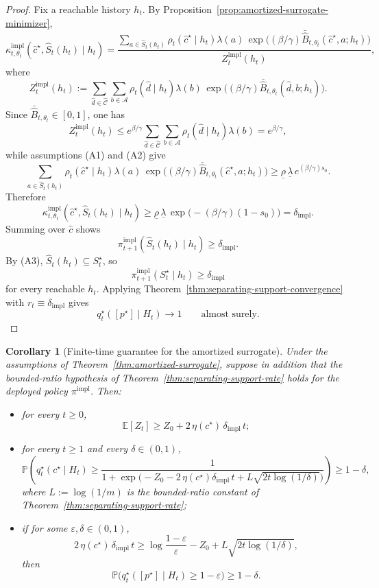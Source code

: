 \documentclass[11pt]{article}
\newtheorem{corollary}[theorem]{Corollary}
\theoremstyle{definition}
\theoremstyle{remark}
\newcommand{\Acal}{\mathcal{A}}
\newcommand{\Ccal}{\mathcal{C}}
\newcommand{\E}{\mathbb{E}}
\newcommand{\Prob}{\mathbb{P}}
\begin{document}
\begin{proof}
Fix a reachable history $h_t$. By Proposition~\ref{prop:amortized-surrogate-minimizer},
\[
\kappa_{t,\theta_t}^{\mathrm{impl}}(\hat c^\star,\widehat S_t(h_t)\mid h_t)
=
\frac{
\sum_{a\in\widehat S_t(h_t)}
\rho_t(\hat c^\star\mid h_t)\lambda(a)\,
\exp\!\bigl((\beta/\gamma)\bar{\widehat B}_{t,\theta_t}(\hat c^\star,a;h_t)\bigr)}
{Z_t^{\mathrm{impl}}(h_t)},
\]
where
\[
Z_t^{\mathrm{impl}}(h_t)
:=
\sum_{\hat d\in\widehat{\Ccal}}\sum_{b\in\Acal}
\rho_t(\hat d\mid h_t)\lambda(b)\,
\exp\!\bigl((\beta/\gamma)\bar{\widehat B}_{t,\theta_t}(\hat d,b;h_t)\bigr).
\]
Since $\bar{\widehat B}_{t,\theta_t}\in[0,1]$, one has
\[
Z_t^{\mathrm{impl}}(h_t)\le e^{\beta/\gamma}
\sum_{\hat d\in\widehat{\Ccal}}\sum_{b\in\Acal}
\rho_t(\hat d\mid h_t)\lambda(b)
=
e^{\beta/\gamma},
\]
while assumptions \textup{(A1)} and \textup{(A2)} give
\[
\sum_{a\in\widehat S_t(h_t)}
\rho_t(\hat c^\star\mid h_t)\lambda(a)\,
\exp\!\bigl((\beta/\gamma)\bar{\widehat B}_{t,\theta_t}(\hat c^\star,a;h_t)\bigr)
\ge
\underline\rho\,\underline\lambda\,e^{(\beta/\gamma)s_0}.
\]
Therefore
\[
\kappa_{t,\theta_t}^{\mathrm{impl}}(\hat c^\star,\widehat S_t(h_t)\mid h_t)
\ge
\underline\rho\,\underline\lambda\,
\exp\!\bigl(-(\beta/\gamma)(1-s_0)\bigr)
=
\delta_{\mathrm{impl}}.
\]
Summing over $\hat c$ shows
\[
\pi_{t+1}^{\mathrm{impl}}(\widehat S_t(h_t)\mid h_t)\ge \delta_{\mathrm{impl}}.
\]
By \textup{(A3)}, $\widehat S_t(h_t)\subseteq S_t^\star$, so
\[
\pi_{t+1}^{\mathrm{impl}}(S_t^\star\mid h_t)\ge \delta_{\mathrm{impl}}
\]
for every reachable $h_t$. Applying Theorem~\ref{thm:separating-support-convergence} with $r_t\equiv \delta_{\mathrm{impl}}$ gives
\[
q_t^\star([p^\star]\mid H_t)\to 1
\qquad\text{almost surely.}
\]
\end{proof}

\begin{corollary}[Finite-time guarantee for the amortized surrogate]
\label{cor:amortized-surrogate-finite-time}
Under the assumptions of Theorem~\ref{thm:amortized-surrogate}, suppose in addition that the bounded-ratio hypothesis of Theorem~\ref{thm:separating-support-rate} holds for the deployed policy $\pi^{\mathrm{impl}}$. Then:
\begin{itemize}
\item[(i)] for every $t\ge 0$,
\[
\E[Z_t]\ge Z_0+2\,\eta(c^\star)\,\delta_{\mathrm{impl}}\,t;
\]
\item[(ii)] for every $t\ge 1$ and every $\delta\in(0,1)$,
\[
\Prob\!\left(
q_t^\star(c^\star\mid H_t)\ge
\frac{1}{1+\exp\!\bigl(-Z_0-2\,\eta(c^\star)\delta_{\mathrm{impl}}\,t+L\sqrt{2t\log(1/\delta)}\bigr)}
\right)\ge 1-\delta,
\]
where $L:=\log(1/m)$ is the bounded-ratio constant of Theorem~\ref{thm:separating-support-rate};
\item[(iii)] if for some $\varepsilon,\delta\in(0,1)$,
\[
2\,\eta(c^\star)\,\delta_{\mathrm{impl}}\,t
\ge
\log\frac{1-\varepsilon}{\varepsilon}-Z_0+L\sqrt{2t\log(1/\delta)},
\]
then
\[
\Prob\!\bigl(q_t^\star([p^\star]\mid H_t)\ge 1-\varepsilon\bigr)\ge 1-\delta.
\]
\end{itemize}
\end{corollary}
\end{document}
